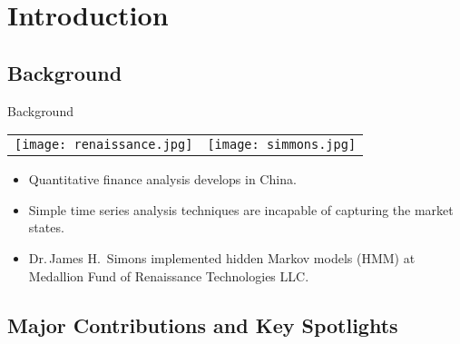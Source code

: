 
\section{\large Introduction}


\subsection{Background}

\begin{frame}[fragile,t]{Background}
	\begin{center}
	\begin{tabular}{m{} m{}}
	\center\texttt{[image: renaissance.jpg]} & 
	\center\texttt{[image: simmons.jpg]}
	\end{tabular}
	\end{center}

	\begin{itemize}
	\item Quantitative finance analysis develops in China.
	\item Simple time series analysis techniques are incapable of capturing the market states.
	\item Dr.\,James H.~Simons implemented hidden Markov models (HMM)
		at Medallion Fund of Renaissance Technologies LLC.
	\end{itemize}

\end{frame}


\subsection{Major Contributions and Key Spotlights}

